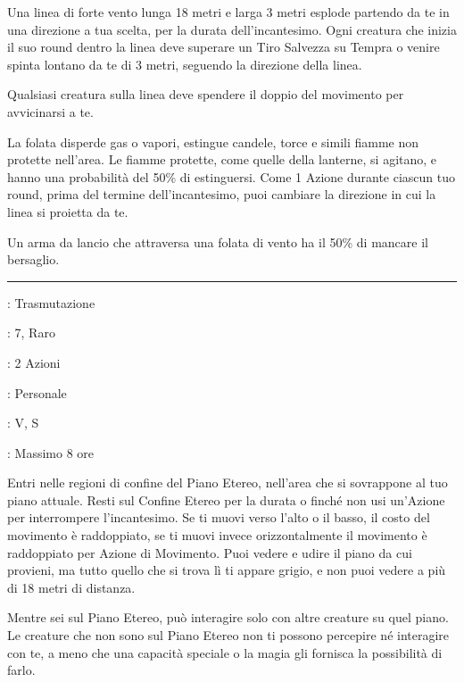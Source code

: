 \begin{multicols}{2}
Una linea di forte vento lunga 18 metri e larga 3 metri esplode partendo da te in una direzione a tua scelta, per la durata dell'incantesimo. Ogni creatura che inizia il suo round dentro la linea deve superare un Tiro Salvezza su Tempra o venire spinta lontano da te di 3 metri, seguendo la direzione della linea.

Qualsiasi creatura sulla linea deve spendere il doppio del movimento per avvicinarsi a te.

La folata disperde gas o vapori, estingue candele, torce e simili fiamme non protette nell'area. Le fiamme protette, come quelle della lanterne, si agitano, e hanno una probabilità del 50\% di estinguersi. Come 1 Azione durante ciascun tuo round, prima del termine dell'incantesimo, puoi cambiare la direzione in cui la linea si proietta da te.

Un arma da lancio che attraversa una folata di vento ha il 50\% di mancare il bersaglio.

\smallskip\noindent\rule{\linewidth}{2pt} \hypertarget{Forma Eterea}{}\medskip{}
\noindent
\begin{description}[noitemsep, topsep=0pt, parsep=0pt, partopsep=0pt, leftmargin=0cm, labelwidth=2.8cm]
	\item[\textbf{Lista di Magia}]: Trasmutazione
	\item[\textbf{Livello}]: 7, Raro
	\item[\textbf{T. di Lancio}]: 2 Azioni
	\item[\textbf{Gittata}]: Personale
	\item[\textbf{Componenti}]: V, S
	\item[\textbf{Durata}]: Massimo 8 ore
\end{description}

Entri nelle regioni di confine del Piano Etereo, nell'area che si sovrappone al tuo piano attuale. Resti sul Confine Etereo per la durata o finché non usi un'Azione per interrompere l'incantesimo. Se ti muovi verso l'alto o il basso, il costo del movimento è raddoppiato, se ti muovi invece orizzontalmente il movimento è raddoppiato per Azione di Movimento. Puoi vedere e udire il piano da cui provieni, ma tutto quello che si trova lì ti appare grigio, e non puoi vedere a più di 18 metri di distanza.

Mentre sei sul Piano Etereo, può interagire solo con altre creature su quel piano. Le creature che non sono sul Piano Etereo non ti possono percepire né interagire con te, a meno che una capacità speciale o la magia gli fornisca la possibilità di farlo.


\end{multicols}
